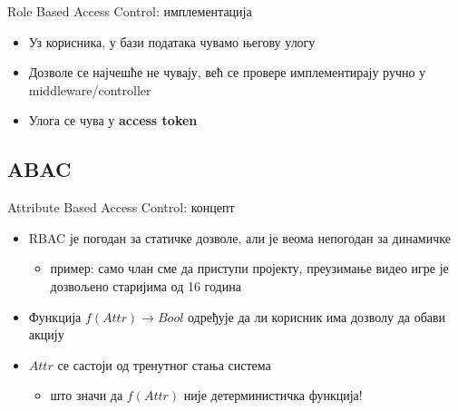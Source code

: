 \documentclass{beamer}
\begin{document}
    \begin{frame}{Role Based Access Control: имплементација}
        \begin{itemize}
            \item Уз корисника, у бази података чувамо његову улогу
            \item Дозволе се најчешће не чувају, већ се провере имплементирају ручно у middleware/controller
            \item Улога се чува у \textbf{access token}
        \end{itemize}
    \end{frame}
    
    \subsection{ABAC}
    
    \begin{frame}{Attribute Based Access Control: концепт}
        \begin{itemize}
            \item RBAC је погодан за статичке дозволе, али је веома непогодан за динамичке
            \begin{itemize}
                \item пример: само члан сме да приступи пројекту, преузимање видео игре је дозвољено старијима од 16 година
            \end{itemize}
            \item Функција \begin{math}f(Attr) \rightarrow Bool\end{math} одређује да ли корисник има дозволу да обави акцију
            \item \begin{math}Attr\end{math} се састоји од тренутног стања система
            \begin{itemize}
                \item што значи да \begin{math}f(Attr)\end{math} није детерминистичка функција!
            \end{itemize}
        \end{itemize}
    \end{frame}
    
\end{document}
